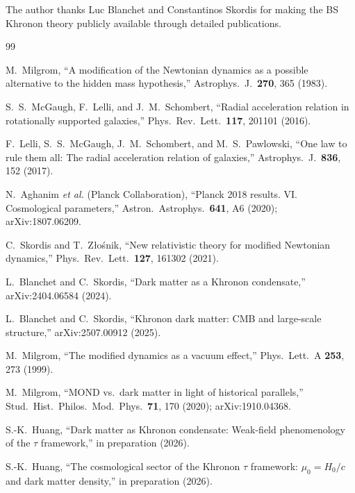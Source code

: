 \documentclass[prl,twocolumn,superscriptaddress,longbibliography]{revtex4-2}
\begin{document}
\begin{acknowledgments}
The author thanks Luc Blanchet and Constantinos Skordis
for making the BS Khronon theory publicly available
through detailed publications.
\end{acknowledgments}


\begin{thebibliography}{99}

M.~Milgrom,
``A modification of the Newtonian dynamics as a possible
alternative to the hidden mass hypothesis,''
Astrophys.\ J.\ \textbf{270}, 365 (1983).

S.~S.~McGaugh, F.~Lelli, and J.~M.~Schombert,
``Radial acceleration relation in rotationally supported
galaxies,''
Phys.\ Rev.\ Lett.\ \textbf{117}, 201101 (2016).

F.~Lelli, S.~S.~McGaugh, J.~M.~Schombert, and
M.~S.~Pawlowski,
``One law to rule them all: The radial acceleration
relation of galaxies,''
Astrophys.\ J.\ \textbf{836}, 152 (2017).

N.~Aghanim \textit{et al.} (Planck Collaboration),
``Planck 2018 results. VI. Cosmological parameters,''
Astron.\ Astrophys.\ \textbf{641}, A6 (2020);
arXiv:1807.06209.

C.~Skordis and T.~Z\l o\'snik,
``New relativistic theory for modified Newtonian
dynamics,''
Phys.\ Rev.\ Lett.\ \textbf{127}, 161302 (2021).

L.~Blanchet and C.~Skordis,
``Dark matter as a Khronon condensate,''
arXiv:2404.06584 (2024).

L.~Blanchet and C.~Skordis,
``Khronon dark matter: CMB and large-scale structure,''
arXiv:2507.00912 (2025).

M.~Milgrom,
``The modified dynamics as a vacuum effect,''
Phys.\ Lett.\ A \textbf{253}, 273 (1999).

M.~Milgrom,
``MOND vs.\ dark matter in light of historical parallels,''
Stud.\ Hist.\ Philos.\ Mod.\ Phys.\ \textbf{71}, 170 (2020);
arXiv:1910.04368.

S.-K.~Huang,
``Dark matter as Khronon condensate: Weak-field
phenomenology of the $\tau$ framework,''
in preparation (2026).

S.-K.~Huang,
``The cosmological sector of the Khronon $\tau$ framework:
$\mu_0 = H_0/c$ and dark matter density,''
in preparation (2026).

\end{thebibliography}
\end{document}
